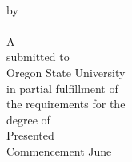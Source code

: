 \begin{titlepage}
	
    \thispagestyle{empty}
	\begin{center}
	\makeatletter
	\setlength{\baselineskip}{14.5pt}
	{\heading \@title} \\
	\emptyline by\\ \emptyline
	\@author\\
	\vfill
	A \MakeUppercase{\@doctype}\\ \emptyline
	submitted to\\ \emptyline
	Oregon State University\\
	\vfill
	in partial fulfillment of\\
	the requirements for the\\
	degree of\\ \emptyline
	\@degree
	\vfill
	Presented \@submitdate\\
	Commencement June \@commencementyear
	\makeatother
\end{center}
\newpage

\end{titlepage}
